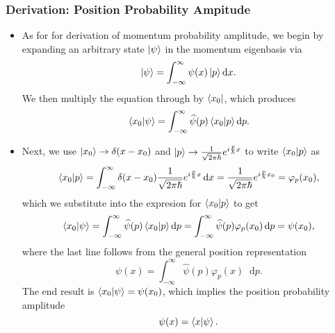 \documentclass[11pt, a4paper]{article}
\newcommand{\diff}{\mathop{}\!\mathrm{d}} %
\newcommand{\F}[1]{\widehat{#1}} %
\begin{document}
\subsubsection{Derivation: Position Probability Ampitude}
\begin{itemize}
    \item As for for derivation of momentum probability amplitude, we begin by expanding an arbitrary state $ \ket{\psi} $ in the momentum eigenbasis via
    \begin{equation*}
        \ket{\psi} = \int_{-\infty}^{\infty}\psi(x) \ket{p} \diff x.
    \end{equation*}
    We then multiply the equation through by $ \bra{x_{0}} $, which produces
    \begin{equation*}
        \braket{x_{0}}{\psi} = \int_{-\infty}^{\infty}\F{\psi}(p)\braket{x_{0}}{p}\diff p.
    \end{equation*}
    
    \item Next, we use $ \ket{x_{0}} \to \delta(x - x_{0}) $ and $ \ket{p} \to \frac{1}{\sqrt{2\pi \hbar}}e^{i \frac{p}{\hbar}x} $ to write $ \braket{x_{0}}{p} $ as
    \begin{equation*}
        \braket{x_{0}}{p} = \int_{-\infty}^{\infty} \delta(x - x_{0}) \frac{1}{\sqrt{2 \pi \hbar}} e^{i \frac{p}{\hbar}x}\diff x = \frac{1}{\sqrt{2\pi \hbar}} e^{i \frac{p}{\hbar}x_{0}} = \varphi_{p}(x_{0}),
    \end{equation*}
    which we substitute into the expresion for $ \braket{x_{0}}{p} $ to get
    \begin{equation*}
        \braket{x_{0}}{\psi} = \int_{-\infty}^{\infty}\F{\psi}(p)\braket{x_{0}}{p}\diff p = \int_{-\infty}^{\infty} \F{\psi}(p) \varphi_{p}(x_{0}) \diff p = \psi(x_{0}),
    \end{equation*}
    where the last line follows from the general position representation
    \begin{equation*}
        \psi(x) = \int_{-\infty}^{\infty}\F{\psi}(p)\varphi_{p}(x)\diff p.
    \end{equation*}
    The end result is $ \braket{x_{0}}{\psi} = \psi(x_{0}) $, which implies the position probability amplitude
    \begin{equation*}
        \psi(x) = \braket{x}{\psi}.
    \end{equation*}


\end{itemize}
\end{document}
